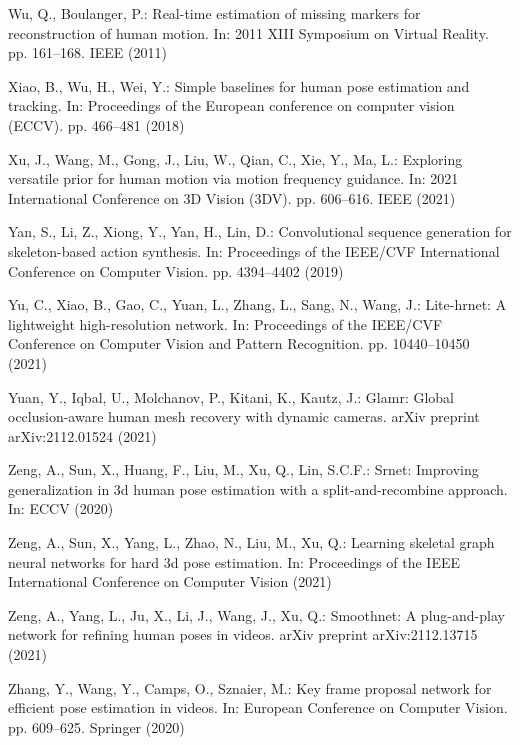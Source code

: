 \documentclass[runningheads]{llncs}
\begin{document}
\begin{thebibliography}{10}
Wu, Q., Boulanger, P.: Real-time estimation of missing markers for
  reconstruction of human motion. In: 2011 XIII Symposium on Virtual Reality.
  pp. 161--168. IEEE (2011)

Xiao, B., Wu, H., Wei, Y.: Simple baselines for human pose estimation and
  tracking. In: Proceedings of the European conference on computer vision
  (ECCV). pp. 466--481 (2018)

Xu, J., Wang, M., Gong, J., Liu, W., Qian, C., Xie, Y., Ma, L.: Exploring
  versatile prior for human motion via motion frequency guidance. In: 2021
  International Conference on 3D Vision (3DV). pp. 606--616. IEEE (2021)

Yan, S., Li, Z., Xiong, Y., Yan, H., Lin, D.: Convolutional sequence generation
  for skeleton-based action synthesis. In: Proceedings of the IEEE/CVF
  International Conference on Computer Vision. pp. 4394--4402 (2019)

Yu, C., Xiao, B., Gao, C., Yuan, L., Zhang, L., Sang, N., Wang, J.: Lite-hrnet:
  A lightweight high-resolution network. In: Proceedings of the IEEE/CVF
  Conference on Computer Vision and Pattern Recognition. pp. 10440--10450
  (2021)

Yuan, Y., Iqbal, U., Molchanov, P., Kitani, K., Kautz, J.: Glamr: Global
  occlusion-aware human mesh recovery with dynamic cameras. arXiv preprint
  arXiv:2112.01524  (2021)

Zeng, A., Sun, X., Huang, F., Liu, M., Xu, Q., Lin, S.C.F.: Srnet: Improving
  generalization in 3d human pose estimation with a split-and-recombine
  approach. In: ECCV (2020)

Zeng, A., Sun, X., Yang, L., Zhao, N., Liu, M., Xu, Q.: Learning skeletal graph
  neural networks for hard 3d pose estimation. In: Proceedings of the IEEE
  International Conference on Computer Vision (2021)

Zeng, A., Yang, L., Ju, X., Li, J., Wang, J., Xu, Q.: Smoothnet: A
  plug-and-play network for refining human poses in videos. arXiv preprint
  arXiv:2112.13715  (2021)

Zhang, Y., Wang, Y., Camps, O., Sznaier, M.: Key frame proposal network for
  efficient pose estimation in videos. In: European Conference on Computer
  Vision. pp. 609--625. Springer (2020)


\end{thebibliography}
\end{document}

